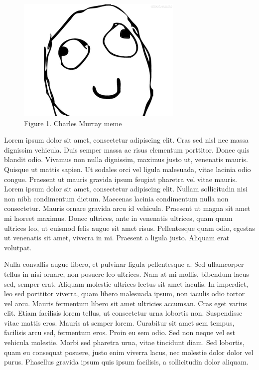 \documentclass{article}
\begin{document}
\begin{figure}[h] \includegraphics{meme.png} 
\captionsetup{labelformat=empty} 
\caption{Figure 1. Charles Murray meme} \centering \end{figure}

 Lorem ipsum dolor sit amet, consectetur adipiscing elit. Cras sed nisl nec massa dignissim vehicula. Duis semper massa ac risus elementum porttitor. Donec quis blandit odio. Vivamus non nulla dignissim, maximus justo ut, venenatis mauris. Quisque ut mattis sapien. Ut sodales orci vel ligula malesuada, vitae lacinia odio congue. Praesent ut mauris gravida ipsum feugiat pharetra vel vitae mauris. Lorem ipsum dolor sit amet, consectetur adipiscing elit. Nullam sollicitudin nisi non nibh condimentum dictum. Maecenas lacinia condimentum nulla non consectetur. Mauris ornare gravida arcu id vehicula. Praesent ut magna sit amet mi laoreet maximus. Donec ultrices, ante in venenatis ultrices, quam quam ultrices leo, ut euismod felis augue sit amet risus. Pellentesque quam odio, egestas ut venenatis sit amet, viverra in mi. Praesent a ligula justo. Aliquam erat volutpat. 



 Nulla convallis augue libero, et pulvinar ligula pellentesque a. Sed ullamcorper tellus in nisi ornare, non posuere leo ultrices. Nam at mi mollis, bibendum lacus sed, semper erat. Aliquam molestie ultrices lectus sit amet iaculis. In imperdiet, leo sed porttitor viverra, quam libero malesuada ipsum, non iaculis odio tortor vel arcu. Mauris fermentum libero sit amet ultricies accumsan. Cras eget varius elit. Etiam facilisis lorem tellus, ut consectetur urna lobortis non. Suspendisse vitae mattis eros. Mauris at semper lorem. Curabitur sit amet sem tempus, facilisis arcu sed, fermentum eros. Proin eu sem odio. Sed non neque vel est vehicula molestie. Morbi sed pharetra urna, vitae tincidunt diam. Sed lobortis, quam eu consequat posuere, justo enim viverra lacus, nec molestie dolor dolor vel purus. Phasellus gravida ipsum quis ipsum facilisis, a sollicitudin dolor aliquam. 
\end{document}
